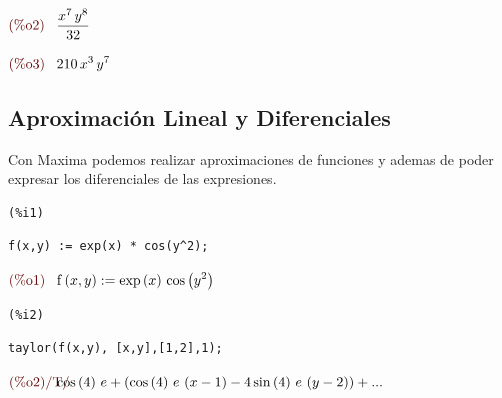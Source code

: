\documentclass[12pt]{article}
\begin{document}
\begin{math}\displaystyle
\parbox{8ex}{\color{labelcolor}(\%o2) }
\frac{{x}^{7}\,{y}^{8}}{32}
\end{math}

\begin{math}\displaystyle
\parbox{8ex}{\color{labelcolor}(\%o3) }
210\,{x}^{3}\,{y}^{7}
\end{math}


\subsection{Aproximación Lineal y Diferenciales}
Con Maxima podemos realizar aproximaciones de funciones y ademas de poder expresar los diferenciales de las expresiones.
\noindent

\begin{minipage}[t]{8ex}{\color{red}\bf
\begin{verbatim}
(%i1) 
\end{verbatim}}
\end{minipage}
\begin{minipage}[t]{\textwidth}{\color{blue}
\begin{verbatim}
f(x,y) := exp(x) * cos(y^2);
\end{verbatim}}
\end{minipage}

\begin{math}\displaystyle
\parbox{8ex}{\color{labelcolor}(\%o1) }
\mathrm{f}\left( x,y\right) :=\mathrm{exp}\left( x\right) \,\mathrm{cos}\left( {y}^{2}\right) 
\end{math}


\noindent

\begin{minipage}[t]{8ex}{\color{red}\bf
\begin{verbatim}
(%i2) 
\end{verbatim}}
\end{minipage}
\begin{minipage}[t]{\textwidth}{\color{blue}
\begin{verbatim}
taylor(f(x,y), [x,y],[1,2],1);
\end{verbatim}}
\end{minipage}

\begin{math}\displaystyle
\parbox{8ex}{\color{labelcolor}(\%o2)/T/ }
\mathrm{cos}\left( 4\right) \,e+\left( \mathrm{cos}\left( 4\right) \,e\,\left( x-1\right) -4\,\mathrm{sin}\left( 4\right) \,e\,\left( y-2\right) \right) +...
\end{math}
\end{document}
